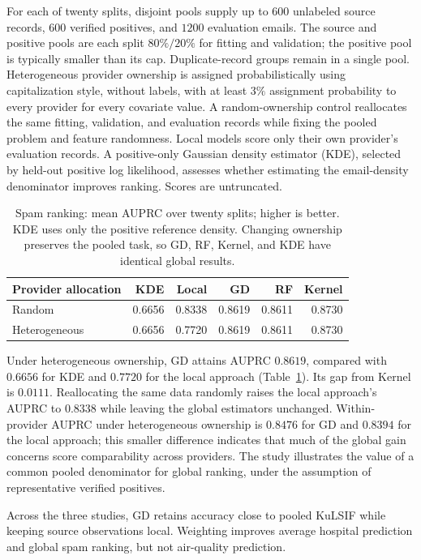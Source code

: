 For each of twenty splits, disjoint pools supply up to $600$ unlabeled
source records, $600$ verified positives, and $1200$ evaluation emails.
The source and positive pools are each split $80\%/20\%$ for fitting and
validation; the positive pool is typically smaller than its cap.
Duplicate-record groups remain in a single pool. Heterogeneous provider
ownership is assigned probabilistically using capitalization style, without
labels, with at least $3\%$ assignment probability to every provider for
every covariate value. A random-ownership control reallocates the same
fitting, validation, and evaluation records while fixing the pooled problem
and feature randomness. Local models score only their own provider's
evaluation records. A positive-only Gaussian density estimator (KDE),
selected by held-out positive log likelihood, assesses whether estimating
the email-density denominator improves ranking. Scores are untruncated.

\begin{table}[htbp]
\centering
\caption{Spam ranking: mean AUPRC over twenty splits; higher is better.
KDE uses only the positive reference density. Changing ownership preserves
the pooled task, so GD, RF, Kernel, and KDE have identical global results.}
\label{tab:applications-spam}
\medskip
\small
\begin{tabular}{lrrrrr}
\toprule
Provider allocation & KDE & Local & GD & RF & Kernel \\
\midrule
Random & 0.6656 & 0.8338 & 0.8619 & 0.8611 & 0.8730 \\
Heterogeneous & 0.6656 & 0.7720 & 0.8619 & 0.8611 & 0.8730 \\
\bottomrule
\end{tabular}
\end{table}

Under heterogeneous ownership, GD attains AUPRC $0.8619$, compared with
$0.6656$ for KDE and $0.7720$ for the local approach
(Table~\ref{tab:applications-spam}). Its gap from Kernel is $0.0111$.
Reallocating the same data randomly raises the local approach's AUPRC to $0.8338$ while
leaving the global estimators unchanged. Within-provider AUPRC under
heterogeneous ownership is $0.8476$ for GD and $0.8394$ for the local approach; this
smaller difference indicates that much of the global gain concerns score
comparability across providers. The study illustrates the value of a common
pooled denominator for global ranking, under the assumption of representative
verified positives.

\begin{samepage}
Across the three studies, GD retains accuracy close to pooled KuLSIF while
keeping source observations local. Weighting improves average hospital
prediction and global spam ranking, but not air-quality prediction.
\end{samepage}
